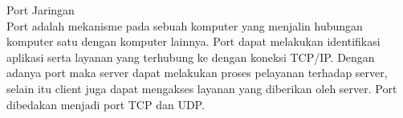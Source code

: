 \documentclass[12pt,times new roman,a4paper]{article}
\begin{document}
\noindent Port Jaringan\\
\indent Port adalah mekanisme pada sebuah komputer yang menjalin hubungan komputer satu dengan komputer lainnya. Port dapat melakukan identifikasi aplikasi serta layanan yang terhubung ke dengan koneksi TCP/IP. Dengan adanya port maka server dapat melakukan proses pelayanan terhadap server, selain itu client juga dapat mengakses layanan yang diberikan oleh server. Port dibedakan menjadi port TCP dan UDP.
\end{document}
